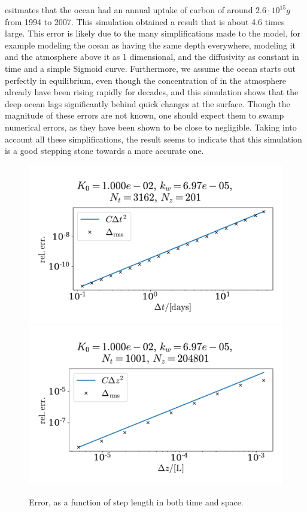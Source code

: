 \documentclass{article}
\begin{document}
    \citeauthor{Gruber1193} \cite{Gruber1193} esitmates that the ocean had an annual uptake of carbon of around $2.6\cdot 10^{15}\si{g}$ from 1994 to 2007.
    This simulation obtained a result that is about 4.6 times large.
    This error is likely due to the many simplifications made to the model, for example modeling the ocean as having the same depth everywhere, modeling it and the atmosphere above it as 1 dimensional, and the diffusivity as constant in time and a simple Sigmoid curve.
    Furthermore, we assume the ocean starts out perfectly in equilibrium, even though the concentration of  in the atmosphere already have been rising rapidly for decades, and this simulation shows that the deep ocean lags significantly behind quick changes at the surface.
    Though the magnitude of these errors are not known, one should expect them to swamp numerical errors, as they have been shown to be close to negligible.
    Taking into account all these simplifications, the result seems to indicate that this simulation is a good stepping stone towards a more accurate one.



    \begin{figure}[H]
        \centering
        \includegraphics[width=.49\textwidth]{../plots/prob3_conv_test_t}
        \includegraphics[width=.49\textwidth]{../plots/prob3_conv_test_z}
        \caption{Error, as a function of step length in both time and space.}
        \label{prob3 conv}
    \end{figure}
\end{document}

